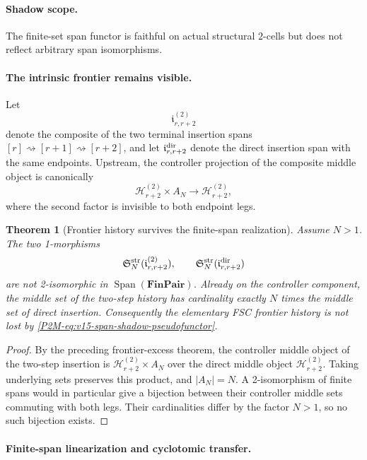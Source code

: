 \documentclass[11pt]{article}
\newtheorem{theorem}{Theorem}[section]
\theoremstyle{remark}
\begin{document}
\paragraph{Shadow scope.}
The finite-set span functor is faithful on actual structural \(2\)-cells but
does not reflect arbitrary span isomorphisms.


\paragraph{The intrinsic frontier remains visible.}

Let
\[
 \mathfrak i_{r,r+2}^{(2)}
\]
denote the composite of the two terminal insertion spans
$[r]\rightsquigarrow[r+1]\rightsquigarrow[r+2]$, and let
$\mathfrak i_{r,r+2}^{\rm dir}$ denote the direct insertion span with the same
endpoints.  Upstream, the controller projection of the composite middle
object is canonically
\begin{equation}\label{P2M-eq:v15-source-frontier-factor}
 \mathcal H_{r+2}^{(2)}\times A_N
 \longrightarrow
 \mathcal H_{r+2}^{(2)},
\end{equation}
where the second factor is invisible to both endpoint legs.

\begin{theorem}[Frontier history survives the finite-span realization]
\label{P2M-thm:v15-frontier-survival}
Assume $N>1$.  The two 1-morphisms
\[
 \mathfrak S_N^{\rm str}(\mathfrak i_{r,r+2}^{(2)}),
 \qquad
 \mathfrak S_N^{\rm str}(\mathfrak i_{r,r+2}^{\rm dir})
\]
are not 2-isomorphic in $\operatorname{Span}(\mathbf{FinPair})$.
Already on the controller component, the middle set of the two-step history
has cardinality exactly $N$ times the middle set of direct insertion.
Consequently the elementary FSC frontier history is not lost by
\eqref{P2M-eq:v15-span-shadow-pseudofunctor}.
\end{theorem}

\begin{proof}
By the preceding frontier-excess theorem, the controller middle object of the
two-step insertion is
$\mathcal H_{r+2}^{(2)}\times A_N$ over the direct middle object
$\mathcal H_{r+2}^{(2)}$.  Taking underlying sets preserves this product, and
$|A_N|=N$.  A 2-isomorphism of finite spans would in particular give a
bijection between their controller middle sets commuting with both legs.
Their cardinalities differ by the factor $N>1$, so no such bijection exists.
\end{proof}


\paragraph{Finite-span linearization and cyclotomic transfer.}
\end{document}
